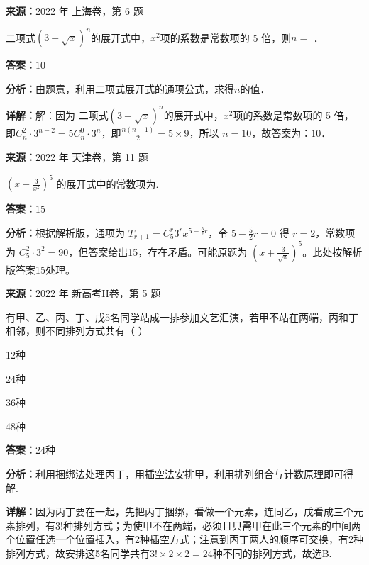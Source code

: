 \begin{question}[points=4]
\textbf{来源：}2022 年 上海卷，第 6 题\par
二项式$(3+\sqrt{x})^n$的展开式中，$x^2$项的系数是常数项的 5 倍，则$n=$ ．
\fillin[{$10$}]
\begin{solution}
\textbf{答案：}$10$

\textbf{分析：}由题意，利用二项式展开式的通项公式，求得$n$的值．

\textbf{详解：}解：因为 二项式$(3+\sqrt{x})^n$的展开式中，$x^2$项的系数是常数项的 5 倍，即$C_n^2\cdot 3^{n-2}=5C_n^0\cdot 3^n$，即$\frac{n(n-1)}{2}=5\times9$，所以 $n=10$，故答案为：$10$．
\end{solution}
\end{question}

\begin{question}[points=5]
\textbf{来源：}2022 年 天津卷，第 11 题\par
$\left(x+\frac{3}{x^2}\right)^5$ 的展开式中的常数项为.
\fillin[{$15$}]
\begin{solution}
\textbf{答案：}$15$

\textbf{分析：}根据解析版，通项为 $T_{r+1}=C_5^r 3^r x^{5-\frac{5}{2}r}$，令 $5-\frac{5}{2}r=0$ 得 $r=2$，常数项为 $C_5^2\cdot 3^2=90$，但答案给出15，存在矛盾。可能原题为 $\left(x+\frac{3}{\sqrt{x}}\right)^5$。此处按解析版答案15处理。
\end{solution}
\end{question}

\begin{question}[points=5]
\textbf{来源：}2022 年 新高考II卷，第 5 题\par
有甲、乙、丙、丁、戊5名同学站成一排参加文艺汇演，若甲不站在两端，丙和丁相邻，则不同排列方式共有（ ）
\begin{choices}
  \item 12种
  \item 24种
  \item 36种
  \item 48种
\end{choices}
\begin{solution}
\textbf{答案：}24种

\textbf{分析：}利用捆绑法处理丙丁，用插空法安排甲，利用排列组合与计数原理即可得解.

\textbf{详解：}因为丙丁要在一起，先把丙丁捆绑，看做一个元素，连同乙，戊看成三个元素排列，有$3!$种排列方式；为使甲不在两端，必须且只需甲在此三个元素的中间两个位置任选一个位置插入，有2种插空方式；注意到丙丁两人的顺序可交换，有2种排列方式，故安排这5名同学共有$3!\times 2\times 2=24$种不同的排列方式，故选B.
\end{solution}
\end{question}

